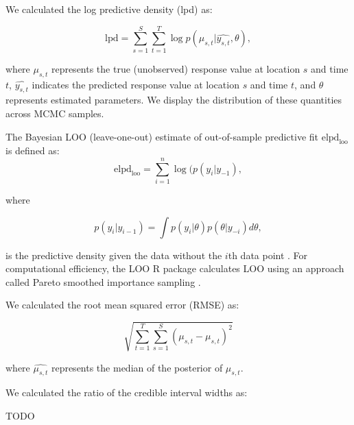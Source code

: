 \documentclass[12pt,english]{article}
\begin{document}
We calculated the log predictive density (lpd) as:

\begin{equation}
  \mathrm{lpd} = \sum^{S}_{s=1}{ \sum^{T}_{t=1}{ \log  p(\mu_{s,t} | \widehat{y_{s,t}}, \theta)}},
\end{equation}

\noindent where $\mu_{s,t}$ represents the true (unobserved) response value at
location $s$ and time $t$, $\widehat{y_{s,t}}$ indicates the predicted
response value at location $s$ and time $t$, and $\theta$ represents estimated
parameters. We display the distribution of these quantities across MCMC
samples.

The Bayesian LOO (leave-one-out) estimate of out-of-sample
predictive fit $\mathrm{elpd}_\mathrm{loo}$ is defined as:
\begin{equation}
  \mathrm{elpd}_\mathrm{loo} = \sum^{n}_{i=1}{\log ( p(y_i | y_{-1}) },
\end{equation}

\noindent where

\begin{equation}
  p(y_i | y_{i-1}) = \int p(y_i | \theta) p (\theta | y_{-i}) d \theta ,
\end{equation}

\noindent is the predictive density given the data without the $i$th data
point \citep{vehtari2016}. For computational efficiency, the LOO R package
calculates LOO using an approach called Pareto smoothed importance sampling
\citep{vehtari2016}.

We calculated the root mean squared error (RMSE) as:

\begin{equation}
  \sqrt{ \sum^{T}_{t=1}{ \sum^{S}_{s=1}{ (\mu_{s,t} - \widehat{ \mu_{s,t} })^2 } } }
\end{equation}

\noindent where $\widehat{\mu_{s,t}}$ represents the median of the posterior
of $\mu_{s,t}$.

We calculated the ratio of the credible interval widths as:

TODO

\renewcommand{\thefigure}{S\arabic{figure}}
\renewcommand{\thetable}{S\arabic{table}}
\setcounter{figure}{0}
\setcounter{table}{0}
\end{document}
